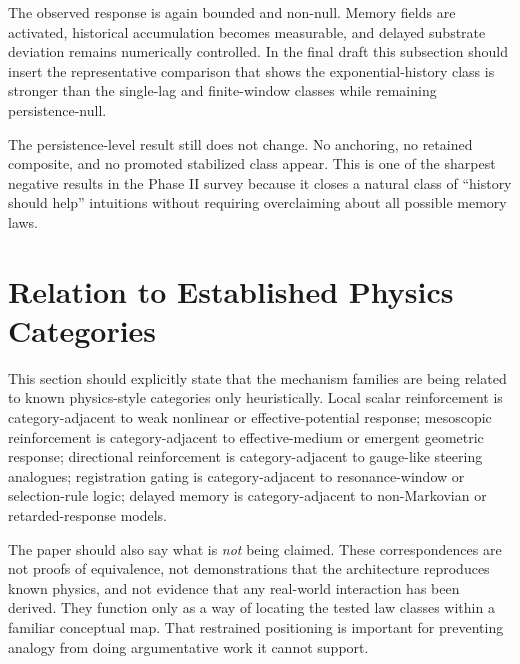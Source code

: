 \documentclass[11pt]{article}
\begin{document}
The observed response is again bounded and non-null. Memory fields are activated, historical accumulation becomes measurable, and delayed substrate deviation remains numerically controlled. In the final draft this subsection should insert the representative comparison that shows the exponential-history class is stronger than the single-lag and finite-window classes while remaining persistence-null.

The persistence-level result still does not change. No anchoring, no retained composite, and no promoted stabilized class appear. This is one of the sharpest negative results in the Phase II survey because it closes a natural class of ``history should help'' intuitions without requiring overclaiming about all possible memory laws.

\section{Relation to Established Physics Categories}

This section should explicitly state that the mechanism families are being related to known physics-style categories only heuristically. Local scalar reinforcement is category-adjacent to weak nonlinear or effective-potential response; mesoscopic reinforcement is category-adjacent to effective-medium or emergent geometric response; directional reinforcement is category-adjacent to gauge-like steering analogues; registration gating is category-adjacent to resonance-window or selection-rule logic; delayed memory is category-adjacent to non-Markovian or retarded-response models.

The paper should also say what is \emph{not} being claimed. These correspondences are not proofs of equivalence, not demonstrations that the architecture reproduces known physics, and not evidence that any real-world interaction has been derived. They function only as a way of locating the tested law classes within a familiar conceptual map. That restrained positioning is important for preventing analogy from doing argumentative work it cannot support.
\end{document}
